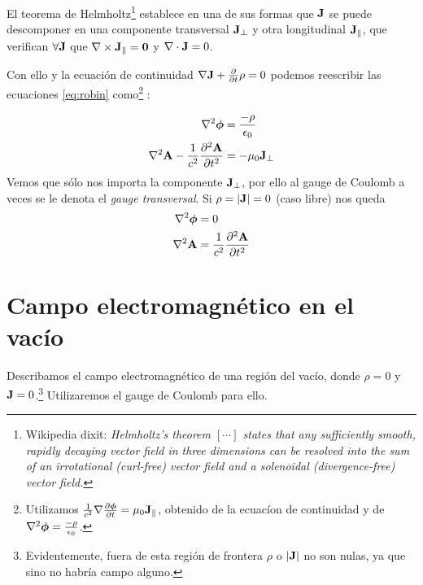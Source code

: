 El teorema de Helmholtz\footnote{
Wikipedia dixit:
\emph{
Helmholtz's theorem $[\cdots]$ states that any sufficiently smooth, rapidly decaying vector
field in three dimensions can be resolved into the sum of an
irrotational (curl-free) vector field and a solenoidal
(divergence-free) vector field.
}
} establece en una de sus formas que $\bm{\mathrm{J}}$ se puede descomponer
en una componente transversal $\bm{\mathrm{J}}_\perp$ y otra longitudinal
$\bm{\mathrm{J}}_\parallel$, que verifican $\forall \bm{\mathrm{J}}$ que  $\nabla
\times \bm{\mathrm{J}}_\parallel = \bm{\mathrm{0}}$ y $\nabla \cdot \bm{\mathrm{J}}=0$.

Con ello y la ecuación de continuidad $\nabla \bm{\mathrm{J}}+
    \pdv{t}\rho=0$ podemos reescribir las ecuaciones \eqref{eq:robin}
  como\footnote{Utilizamos $\frac{1}{c^2} \nabla
    \pdv{\bm{\mathrm{\phi}}}{t}=\mu_0 \bm{\mathrm{J}}_\parallel$, obtenido de
    la ecuacíon de continuidad y de $\nabla^2 \bm{\mathrm{\phi}} =
    \frac{-\rho}{\epsilon_0}$.} :
  
\begin{equation}
  \begin{split}
    \nabla^2 \bm{\mathrm{\phi}} &= \frac{-\rho}{\epsilon_0} \\
    \nabla^2 \bm{\mathrm{A}} - \frac{1}{c^2} \pdv[2]{\bm{\mathrm{A}}}{t} &=
    -\mu_0 \bm{\mathrm{J}}_\perp
  \end{split}
  \end{equation}
Vemos que sólo nos importa la componente $\bm{\mathrm{J}}_\perp$, por ello
al gauge de Coulomb a veces se le denota el \emph{gauge transversal}.
Si $\rho=\abs{\bm{\mathrm{J}}}=0$ (caso libre) nos queda
  \begin{equation}
  \begin{split}
    \nabla^2 \bm{\mathrm{\phi}} &= 0\\
    \nabla^2 \bm{\mathrm{A}} &= \frac{1}{c^2} \pdv[2]{\bm{\mathrm{A}}}{t} 
  \end{split}
  \end{equation}

\section{Campo electromagnético en el vacío}
Describamos el campo electromagnético de una región del vacío, donde
$\rho=0$ y $\bm{\mathrm{J}}=0$.\footnote{Evidentemente, fuera de esta
  región de frontera $\rho$ o $\abs{\bm{\mathrm{J}}}$ no son nulas, ya que
  sino no habría campo alguno.} Utilizaremos el gauge de Coulomb para ello.

